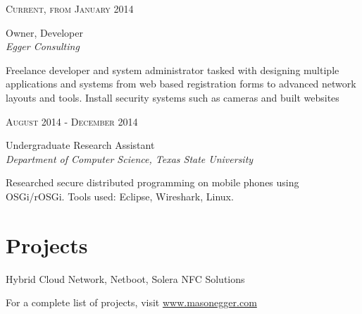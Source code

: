 \documentclass[10pt]{article} %
\begin{document}
\begin{minipage}[t]{0.5\textwidth}

{\raggedleft\textsc{Current, from January 2014}\par}

{\raggedright\large Owner, Developer\\
\textit{Egger Consulting}\\[5pt]}

\normalsize{Freelance developer and system administrator tasked with designing multiple applications and systems from web based registration forms to advanced network layouts and tools. Install security systems such as cameras and built websites}\\




{\raggedleft\textsc{August 2014 - December 2014}\par}

{\raggedright\large Undergraduate Research Assistant\\
\textit{Department of Computer Science, Texas State University}\\[5pt]}

\normalsize{Researched secure distributed programming on mobile phones using OSGi/rOSGi. Tools used: Eclipse, Wireshark, Linux.}\\

\section{Projects}

{\raggedright\large Hybrid Cloud Network, Netboot, Solera NFC Solutions\\}

\normalsize{For a complete list of projects, visit \href{http://www.masonegger.com}{www.masonegger.com}}\\

\end{minipage} %
\hfill
\end{document}
